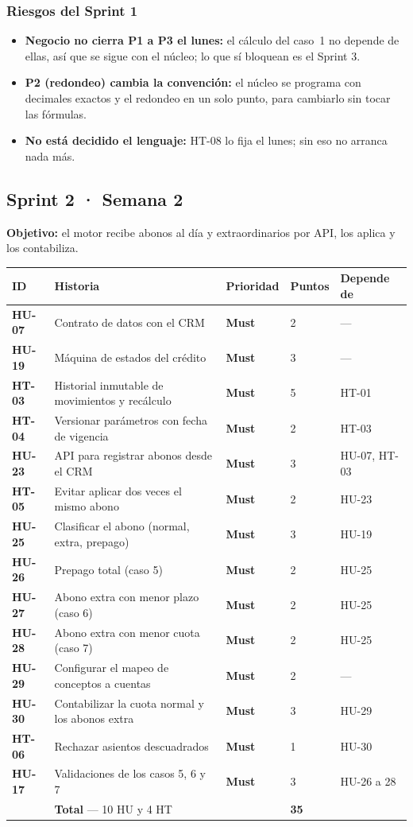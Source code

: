 \documentclass[11pt,a4paper]{article}
\newcommand{\must}{\colorbox{alerta}{\color{white}\textbf{\small Must}}}
\begin{document}
\subsubsection*{Riesgos del Sprint 1}
\begin{itemize}
  \item \textbf{Negocio no cierra P1 a P3 el lunes:} el cálculo del caso~1 no depende de ellas,
        así que se sigue con el núcleo; lo que sí bloquean es el Sprint 3.
  \item \textbf{P2 (redondeo) cambia la convención:} el núcleo se programa con decimales exactos
        y el redondeo en un solo punto, para cambiarlo sin tocar las fórmulas.
  \item \textbf{No está decidido el lenguaje:} HT-08 lo fija el lunes; sin eso no arranca nada más.
\end{itemize}

\subsection{Sprint 2 · Semana 2}
\noindent\textbf{Objetivo:} el motor recibe abonos al día y extraordinarios por API, los aplica y los contabiliza.

\begin{longtable}{>{\bfseries}p{1.2cm} p{8.6cm} p{1.5cm} p{1.1cm} p{2.2cm}}
\toprule
ID & Historia & Prioridad & Puntos & Depende de \\
\midrule
\endhead
HU-07 & Contrato de datos con el CRM & \must & 2 & — \\
HU-19 & Máquina de estados del crédito & \must & 3 & — \\
HT-03 & Historial inmutable de movimientos y recálculo & \must & 5 & HT-01 \\
HT-04 & Versionar parámetros con fecha de vigencia & \must & 2 & HT-03 \\
HU-23 & API para registrar abonos desde el CRM & \must & 3 & HU-07, HT-03 \\
HT-05 & Evitar aplicar dos veces el mismo abono & \must & 2 & HU-23 \\
HU-25 & Clasificar el abono (normal, extra, prepago) & \must & 3 & HU-19 \\
HU-26 & Prepago total (caso 5) & \must & 2 & HU-25 \\
HU-27 & Abono extra con menor plazo (caso 6) & \must & 2 & HU-25 \\
HU-28 & Abono extra con menor cuota (caso 7) & \must & 2 & HU-25 \\
HU-29 & Configurar el mapeo de conceptos a cuentas & \must & 2 & — \\
HU-30 & Contabilizar la cuota normal y los abonos extra & \must & 3 & HU-29 \\
HT-06 & Rechazar asientos descuadrados & \must & 1 & HU-30 \\
HU-17 & Validaciones de los casos 5, 6 y 7 & \must & 3 & HU-26 a 28 \\
\midrule
 & \textbf{Total} — 10 HU y 4 HT & & \textbf{35} & \\
\bottomrule
\end{longtable}
\end{document}

